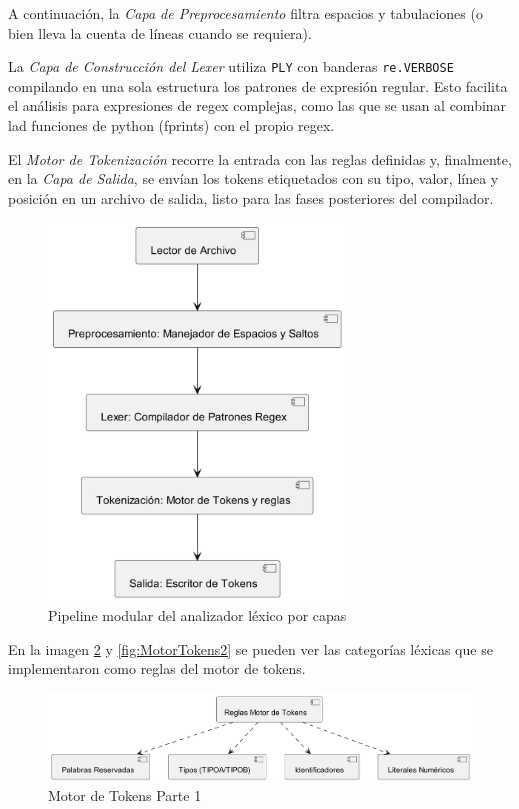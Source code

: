 \documentclass{article}
\begin{document}
A continuación, la \emph{Capa de Preprocesamiento} filtra espacios y tabulaciones 
(o bien lleva la cuenta de líneas cuando se requiera).

La \emph{Capa de Construcción del Lexer} utiliza \texttt{PLY} con banderas 
\texttt{re.VERBOSE} compilando en una sola estructura los patrones de expresión 
regular. Esto facilita el análisis para expresiones de regex
complejas, como las que se usan al combinar
lad funciones de python (fprints) con el propio regex.

El \emph{Motor de Tokenización} recorre la entrada con las reglas definidas y, 
finalmente, en la \emph{Capa de Salida}, se envían los tokens etiquetados 
con su tipo, valor, línea y posición en un archivo de salida, 
listo para las fases posteriores del compilador.

\begin{figure}[ht]
  \centering
  \includegraphics[width=0.7\textwidth]{Flujo.png}
  \caption{Pipeline modular del analizador léxico por capas}
  \label{fig:pipelineLexico}
\end{figure}

\vspace{1em}

En la imagen \ref{fig:MotorTokens1} y \ref{fig:MotorTokens2}
 se pueden ver las categorías léxicas que se implementaron como
reglas del motor de tokens.

\begin{figure}[ht]
  \centering
  \includegraphics[width=1\textwidth]{MotorTokens1.png}
  \caption{Motor de Tokens Parte 1}
  \label{fig:MotorTokens1}
\end{figure}
\end{document}
